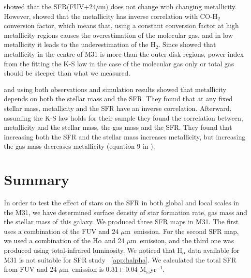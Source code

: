 \documentclass[useAMS,usenatbib]{mn2e}
\newcommand \um    {$\mu$m\ }
\begin{document}
\cite{Leroy08} showed that the SFR(FUV+24$\mu$m) does not change with changing metallicity. However, \cite{Boissier03} showed that the metallicity has inverse correlation with CO-H$_2$ conversion factor, which means that, using a constant conversion factor at high metallicity regions causes the overestimation of the molecular gas, and in low metallicity it leads to the underestimation of the H$_2$. Since \cite{Draine14} showed that metallicity in the centre of M31 is more than the outer disk regions, power index from the fitting the K-S law in the case of the molecular gas only or total gas should be steeper than what we measured.

\cite{Mannucci10} and \cite{Lilly13} using both observations and simulation results showed that metallicity depends on both the stellar mass and the SFR. They found that at any fixed stellar mass, metallicity and the SFR have an inverse correlation. Afterward, assuming the K-S law holds for their sample they found the correlation between, metallicity and the stellar mass, the gas mass and the SFR. They found that increasing both the SFR and the stellar mass increases metallicity, but increasing the gas mass decreases metallicity (equation 9 in \citep{Mannucci10}).


\section{Summary}

In order to test the effect of stars on the SFR in both global and local scales in the M31, we have determined surface density of star formation rate, gas mass and the stellar mass of this galaxy. We produced three SFR maps in M31. The first uses a combination of the FUV and 24 \um emission. For the second SFR map, we used a combination of the H$\alpha$ and 24 \um emission, and the third one was produced using total-infrared luminosity. We noticed that H$_\alpha$ data available for M31 is not suitable for SFR study ~\ref{app:halpha}. We calculated the total SFR from FUV and 24 \um emission is 0.31$\pm$ 0.04 M$_{\odot}$yr$^{-1}$.
\end{document}
